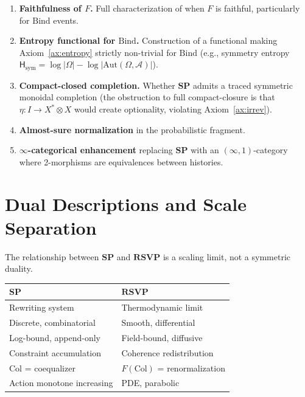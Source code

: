 \documentclass[12pt,a4paper]{article}
\theoremstyle{definition}
\theoremstyle{remark}
\newcommand{\SP}{\mathbf{SP}}
\newcommand{\RSVP}{\mathbf{RSVP}}
\newcommand{\Bind}{\mathrm{Bind}}
\newcommand{\Col}{\mathrm{Col}}
\newcommand{\tensor}{\otimes}
\newcommand{\unit}{I}
\begin{document}
\begin{enumerate}
\item \textbf{Faithfulness of $F$.} Full characterization of when $F$ is faithful,
  particularly for $\Bind$ events.
\item \textbf{Entropy functional for $\Bind$.} Construction of a functional making
  Axiom~\ref{ax:entropy} strictly non-trivial for $\Bind$ (e.g., symmetry entropy
  $\mathsf{H}_{\mathrm{sym}}=\log|\Omega|-\log|\mathrm{Aut}(\Omega,\mathcal{A})|$).
\item \textbf{Compact-closed completion.} Whether $\SP$ admits a traced symmetric
  monoidal completion (the obstruction to full compact-closure is that $\eta:\unit\to
  X^*\tensor X$ would create optionality, violating Axiom~\ref{ax:irrev}).
\item \textbf{Almost-sure normalization} in the probabilistic fragment.
\item \textbf{$\infty$-categorical enhancement} replacing $\SP$ with an
  $(\infty,1)$-category where 2-morphisms are equivalences between histories.
\end{enumerate}

\section{Dual Descriptions and Scale Separation}
\label{sec:dual}

The relationship between $\SP$ and $\RSVP$ is a scaling limit, not a symmetric duality.

\begin{center}
\renewcommand{\arraystretch}{1.4}
\begin{tabular}{ll}
\toprule
\textbf{$\SP$} & \textbf{$\RSVP$} \\
\midrule
Rewriting system & Thermodynamic limit \\
Discrete, combinatorial & Smooth, differential \\
Log-bound, append-only & Field-bound, diffusive \\
Constraint accumulation & Coherence redistribution \\
$\Col$ = coequalizer & $F(\Col)$ = renormalization \\
Action monotone increasing & PDE, parabolic \\
\bottomrule
\end{tabular}
\end{center}
\end{document}
